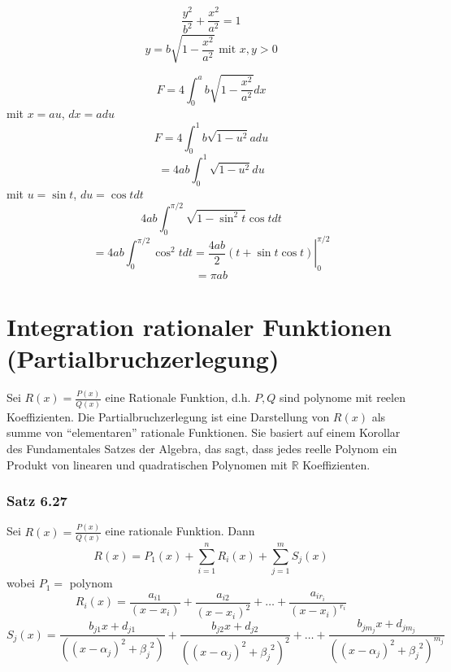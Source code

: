 \begin{enumerate}
\begin{figure}[ht]
\begin{minipage}[b]{0.45\linewidth}
\centering
{}

\end{minipage}
\hspace{0.5cm}
\begin{minipage}[b]{0.45\linewidth}

\centering
$$\frac{y^2}{b^2}+\frac{x^2}{a^2}=1$$
$$y=b\sqrt{1-\frac{x^2}{a^2}}\text{ mit }x,y>0$$

\end{minipage}
\end{figure}
$$F=4\int ^{a}_{0}b\sqrt {1-\dfrac {x^{2}}{a^{2}}}dx$$
mit $x=au$, $dx=adu$ $$F=4\int ^{1}_{0}b\sqrt {1-u^2}adu$$$$=4ab\int ^{1}_{0}\sqrt {1-u^2}du$$ mit $u=\sin t$, $du=\cos tdt$
$$4ab\int ^{\pi /2}_{0}\sqrt {1-\sin^2t}\cos t dt$$$$=4ab\int ^{\pi /2}_{0}\cos ^{2}tdt=\left.\frac{4ab}{2}\left( t+\sin t\cos t\right) \right| ^{\pi /2}_{0}$$ $$=\pi ab$$
\end{enumerate}  



\section{Integration rationaler Funktionen (Partialbruchzerlegung)}
Sei $R(x)=\frac{P(x)}{Q(x)}$ eine Rationale Funktion, d.h. $P,Q$ sind polynome mit reelen Koeffizienten. Die Partialbruchzerlegung ist eine Darstellung von $R(x)$ als summe von ``elementaren'' rationale Funktionen. Sie basiert auf einem Korollar des Fundamentales Satzes der Algebra, das sagt, dass jedes reelle Polynom ein Produkt von linearen und quadratischen Polynomen mit $\mathbb{R}$ Koeffizienten. 

\subsubsection*{Satz 6.27}
Sei $R(x)=\frac{P(x)}{Q(x)}$ eine rationale Funktion. Dann $$R(x)=P_1(x)+\sum ^{n}_{i=1}R_{i}\left( x\right) +\sum ^{m}_{j=1}S_{j}\left( x\right) $$ wobei $P_1=$ polynom $$R_{i}\left( x\right) =\dfrac {a_{i1}}{\left( x-x_{i}\right) }+\dfrac {a_{i2}}{\left( x-x_{i}\right) ^{2}}+\ldots +\dfrac {a_{ir_{i}}}{{\left( x-x_{i}\right)}^{r_i} }$$  $$S_{j}\left( x\right) =\dfrac {b_{j1}x+{d_{j1}}}{\left( \left(x-\alpha_{j}\right)^2+{\beta_{j}}^2\right) }+\dfrac {b_{j2}x+{d_{j2}}}{\left( \left(x-\alpha_{j}\right)^2+{\beta_{j}}^2\right)^2 }+\ldots +\dfrac {b_{j m_j}x+{d_{j m_j}}}{\left( \left(x-\alpha_{j}\right)^2+{\beta_{j}}^2\right)^{m_j} }$$

